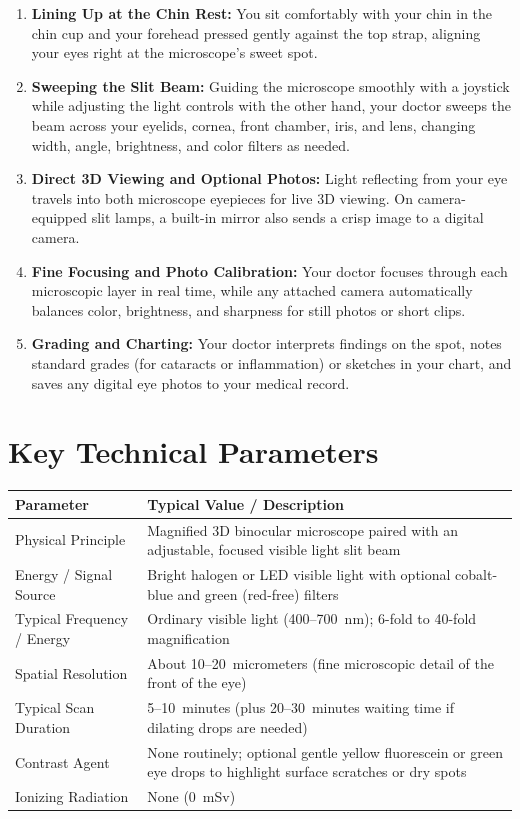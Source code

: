\begin{enumerate}
    \item \textbf{Lining Up at the Chin Rest:} You sit comfortably with your chin in the chin cup and your forehead pressed gently against the top strap, aligning your eyes right at the microscope's sweet spot.
    \item \textbf{Sweeping the Slit Beam:} Guiding the microscope smoothly with a joystick while adjusting the light controls with the other hand, your doctor sweeps the beam across your eyelids, cornea, front chamber, iris, and lens, changing width, angle, brightness, and color filters as needed.
    \item \textbf{Direct 3D Viewing and Optional Photos:} Light reflecting from your eye travels into both microscope eyepieces for live 3D viewing. On camera-equipped slit lamps, a built-in mirror also sends a crisp image to a digital camera.
    \item \textbf{Fine Focusing and Photo Calibration:} Your doctor focuses through each microscopic layer in real time, while any attached camera automatically balances color, brightness, and sharpness for still photos or short clips.
    \item \textbf{Grading and Charting:} Your doctor interprets findings on the spot, notes standard grades (for cataracts or inflammation) or sketches in your chart, and saves any digital eye photos to your medical record.
\end{enumerate}

\section{Key Technical Parameters}

\noindent
\begin{tabularx}{\textwidth}{@{}l X@{}}
\toprule
\textbf{Parameter} & \textbf{Typical Value / Description} \\
\midrule
Physical Principle & Magnified 3D binocular microscope paired with an adjustable, focused visible light slit beam \\
Energy / Signal Source & Bright halogen or LED visible light with optional cobalt-blue and green (red-free) filters \\
Typical Frequency / Energy & Ordinary visible light (400--700~nm); 6-fold to 40-fold magnification \\
Spatial Resolution & About 10--20~micrometers (fine microscopic detail of the front of the eye) \\
Typical Scan Duration & 5--10~minutes (plus 20--30~minutes waiting time if dilating drops are needed) \\
Contrast Agent & None routinely; optional gentle yellow fluorescein or green eye drops to highlight surface scratches or dry spots \\
Ionizing Radiation & None (0~mSv) \\
\bottomrule
\end{tabularx}

